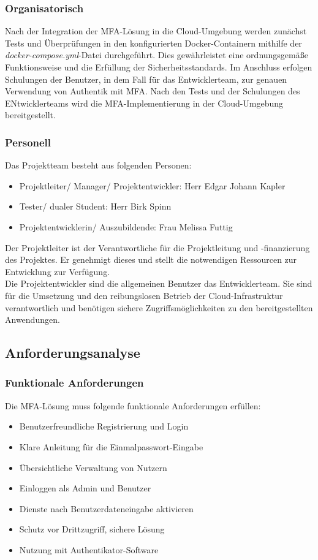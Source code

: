 \subsubsection{Organisatorisch}
\label{sec:Organisatorisch}
Nach der Integration der \acs{MFA}-Lösung in die Cloud-Umgebung werden zunächst Tests und Überprüfungen in den konfigurierten Docker-Containern mithilfe der 
\textit{docker-compose.yml}-Datei durchgeführt. Dies gewährleistet eine ordnungsgemäße Funktionsweise und die Erfüllung der Sicherheitsstandards.
Im Anschluss erfolgen Schulungen der Benutzer, in dem Fall für das Entwicklerteam, zur genauen Verwendung von Authentik mit \acs{MFA}. 
Nach den Tests und der Schulungen des ENtwicklerteams wird die \acs{MFA}-Implementierung in der Cloud-Umgebung bereitgestellt.

\subsubsection{Personell}
\label{sec:Personell}
Das Projektteam besteht aus folgenden Personen:
\begin{itemize} [label=--]
	\item Projektleiter/ Manager/ Projektentwickler: Herr Edgar Johann Kapler
	\item Tester/ dualer Student: Herr Birk Spinn
	\item Projektentwicklerin/ Auszubildende: Frau Melissa Futtig
\end{itemize}
Der Projektleiter ist der Verantwortliche für die Projektleitung und -finanzierung des Projektes. 
Er genehmigt dieses und stellt die notwendigen Ressourcen zur Entwicklung zur Verfügung.
\\Die Projektentwickler sind die allgemeinen Benutzer \bzw das Entwicklerteam. Sie sind für die Umsetzung und den 
reibungslosen Betrieb der Cloud-Infrastruktur verantwortlich und benötigen sichere Zugriffsmöglichkeiten zu den 
bereitgestellten Anwendungen.

\subsection{Anforderungsanalyse}
\label{sec:Anforderungsanalyse}

\subsubsection{Funktionale Anforderungen}
\label{sec:Funktional}
Die MFA-Lösung muss folgende funktionale Anforderungen erfüllen:
\begin{itemize} [label=--]
	\item Benutzerfreundliche Registrierung und Login
	\item Klare Anleitung für die Einmalpasswort-Eingabe
	\item Übersichtliche Verwaltung von Nutzern
	\item Einloggen als Admin und Benutzer
	\item Dienste nach Benutzerdateneingabe aktivieren
	\item Schutz vor Drittzugriff, sichere Lösung
	\item Nutzung mit Authentikator-Software
\end{itemize}

